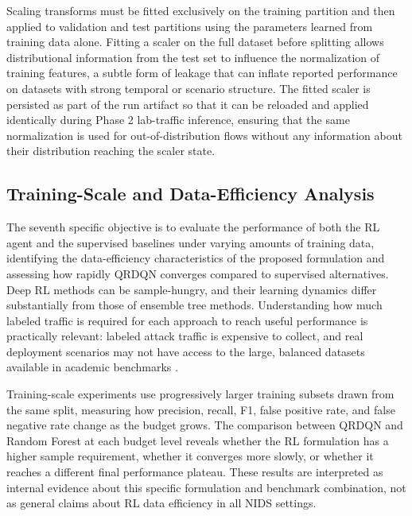 Scaling transforms must be fitted exclusively on the training partition and then applied to validation and test partitions using the parameters learned from training data alone. Fitting a scaler on the full dataset before splitting allows distributional information from the test set to influence the normalization of training features, a subtle form of leakage that can inflate reported performance on datasets with strong temporal or scenario structure. The fitted scaler is persisted as part of the run artifact so that it can be reloaded and applied identically during Phase 2 lab-traffic inference, ensuring that the same normalization is used for out-of-distribution flows without any information about their distribution reaching the scaler state.

\subsection{Training-Scale and Data-Efficiency Analysis}
The seventh specific objective is to evaluate the performance of both the RL agent and the supervised baselines under varying amounts of training data, identifying the data-efficiency characteristics of the proposed formulation and assessing how rapidly QRDQN converges compared to supervised alternatives. Deep RL methods can be sample-hungry, and their learning dynamics differ substantially from those of ensemble tree methods. Understanding how much labeled traffic is required for each approach to reach useful performance is practically relevant: labeled attack traffic is expensive to collect, and real deployment scenarios may not have access to the large, balanced datasets available in academic benchmarks \parencite{Ring2019DatasetSurvey}.

Training-scale experiments use progressively larger training subsets drawn from the same split, measuring how precision, recall, F1, false positive rate, and false negative rate change as the budget grows. The comparison between QRDQN and Random Forest at each budget level reveals whether the RL formulation has a higher sample requirement, whether it converges more slowly, or whether it reaches a different final performance plateau. These results are interpreted as internal evidence about this specific formulation and benchmark combination, not as general claims about RL data efficiency in all NIDS settings.

